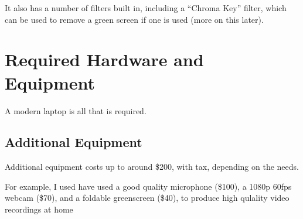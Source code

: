 \documentclass[sigconf]{acmart}
\begin{document}
It also has a number of filters built in, including a  ``Chroma Key'' filter, which can be used to remove a green screen if one is used (more on this later).



\section{Required Hardware and Equipment}
A modern laptop is all that is required.








\subsection{Additional Equipment}
Additional equipment costs up to around \$200, with tax, depending on the needs.

For example, I used have used a good quality microphone (\$100), a 1080p 60fps webcam (\$70), and a foldable greenscreen (\$40), to produce high qulality video recordings at home
\end{document}
